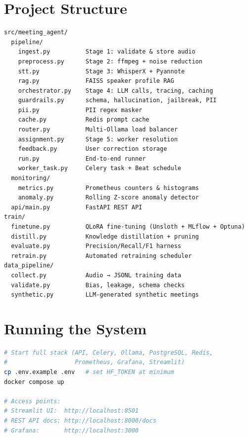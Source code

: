 \documentclass[12pt,a4paper]{article}
\begin{document}
\section{Project Structure}

\begin{lstlisting}
src/meeting_agent/
  pipeline/
    ingest.py          Stage 1: validate & store audio
    preprocess.py      Stage 2: ffmpeg + noise reduction
    stt.py             Stage 3: WhisperX + Pyannote
    rag.py             FAISS speaker profile RAG
    orchestrator.py    Stage 4: LLM calls, tracing, caching
    guardrails.py      schema, hallucination, jailbreak, PII
    pii.py             PII regex masker
    cache.py           Redis prompt cache
    router.py          Multi-Ollama load balancer
    assignment.py      Stage 5: worker resolution
    feedback.py        User correction storage
    run.py             End-to-end runner
    worker_task.py     Celery task + Beat schedule
  monitoring/
    metrics.py         Prometheus counters & histograms
    anomaly.py         Rolling Z-score anomaly detector
  api/main.py          FastAPI REST API
train/
  finetune.py          QLoRA fine-tuning (Unsloth + MLflow + Optuna)
  distill.py           Knowledge distillation + pruning
  evaluate.py          Precision/Recall/F1 harness
  retrain.py           Automated retraining scheduler
data_pipeline/
  collect.py           Audio → JSONL training data
  validate.py          Bias, leakage, schema checks
  synthetic.py         LLM-generated synthetic meetings
\end{lstlisting}

\section{Running the System}

\begin{lstlisting}[language=bash]
# Start full stack (API, Celery, Ollama, PostgreSQL, Redis,
#                   Prometheus, Grafana, Streamlit)
cp .env.example .env   # set HF_TOKEN at minimum
docker compose up

# Access points:
# Streamlit UI:  http://localhost:8501
# REST API docs: http://localhost:8000/docs
# Grafana:       http://localhost:3000
\end{lstlisting}
\end{document}
